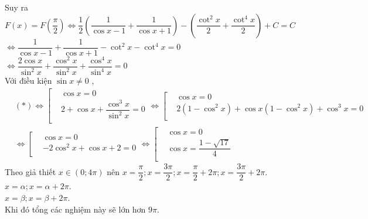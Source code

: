 \begin{ex}
{		Suy ra\\
		$F(x)=F\left(\dfrac{\pi}{2}\right)\Leftrightarrow\dfrac{1}{2}\left(\dfrac{1}{\cos x-1}+\dfrac{1}{\cos x+1}\right)-\left(\dfrac{\cot^2x}{2}+\dfrac{\cot^4x}{2}\right)+C=C$\\
		$\Leftrightarrow\dfrac{1}{\cos x-1}+\dfrac{1}{\cos x+1}-\cot^2x-\cot^4x=0$\\
		$\Leftrightarrow\dfrac{2\cos x}{\sin^2x}+\dfrac{\cos^2x}{\sin^2x}+\dfrac{\cos^4x}{\sin^4x}=0$\\
		Với điều kiện $\sin x\ne 0$ ,\\
		$\begin{aligned}
			&(*)\Leftrightarrow\left[\begin{aligned}
				&\cos x=0\\ 
				& 2+\cos x+\dfrac{\cos^3x}{\sin^2x}=0\\ 
			\end{aligned}\right.\Leftrightarrow\left[\begin{aligned}
				&\cos x=0\\ 
				& 2\left(1-\cos^2x\right)+\cos x\left(1-\cos^2x\right)+\cos^3x=0\\ 
			\end{aligned}\right.\\ 
			&\Leftrightarrow\left[\begin{aligned}
				&\cos x=0\\ 
				&-2\cos^2x+\cos x+2=0\\ 
			\end{aligned}\right.\Leftrightarrow\left[\begin{aligned}
				&\cos x=0\\ 
				&\cos x=\dfrac{1-\sqrt{17}}{4}\\ 
			\end{aligned}\right. 
		\end{aligned}$\\
		Theo giả thiết $x\in\left(0;4\pi\right)$ nên $x=\dfrac{\pi}{2};x=\dfrac{3\pi}{2};x=\dfrac{\pi}{2}+2\pi ;x=\dfrac{3\pi}{2}+2\pi $.\\
		$x=\alpha ;x=\alpha+2\pi $.\\
		$x=\beta ;x=\beta+2\pi $.\\
		Khi đó tổng các nghiệm này sẽ lớn hơn $9\pi $.
	}
\end{ex}

